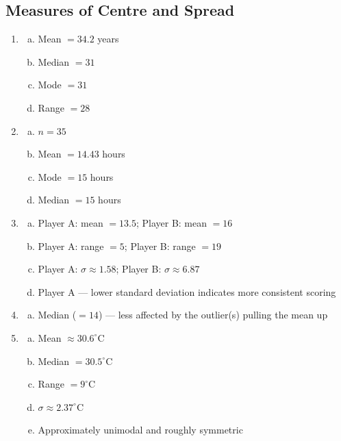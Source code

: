 \documentclass{article}
\begin{document}
\subsection{Measures of Centre and Spread}
\begin{enumerate}
  \item
  \begin{enumerate}[(a)]
    \item Mean $= 34.2$ years
    \item Median $= 31$
    \item Mode $= 31$
    \item Range $= 28$
  \end{enumerate}

  \item
  \begin{enumerate}[(a)]
    \item $n = 35$
    \item Mean $= 14.43$ hours
    \item Mode $= 15$ hours
    \item Median $= 15$ hours
  \end{enumerate}

  \item
  \begin{enumerate}[(a)]
    \item Player A: mean $= 13.5$; Player B: mean $= 16$
    \item Player A: range $= 5$; Player B: range $= 19$
    \item Player A: $\sigma \approx 1.58$; Player B: $\sigma \approx 6.87$
    \item Player A --- lower standard deviation indicates more consistent scoring
  \end{enumerate}

  \item
  \begin{enumerate}[(a)]
    \item Median ($= 14$) --- less affected by the outlier(s) pulling the mean up
  \end{enumerate}

  \item
  \begin{enumerate}[(a)]
    \item Mean $\approx 30.6^\circ$C
    \item Median $= 30.5^\circ$C
    \item Range $= 9^\circ$C
    \item $\sigma \approx 2.37^\circ$C
    \item Approximately unimodal and roughly symmetric
  \end{enumerate}


\end{enumerate}
\end{document}
